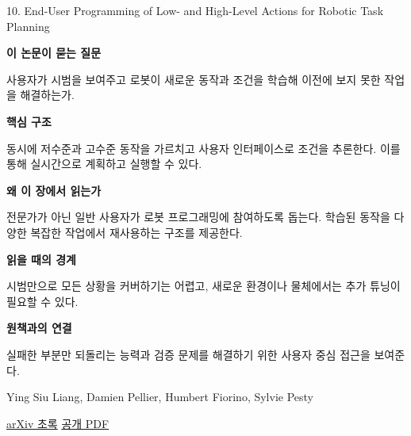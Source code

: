 \documentclass[11pt,openany]{book}
\begin{document}
\begin{termcard}{10. End-User Programming of Low- and High-Level Actions for Robotic Task Planning}

\par

\medskip

{\sffamily\bfseries\color{deepblue} 이 논문이 묻는 질문}\par

사용자가 시범을 보여주고 로봇이 새로운 동작과 조건을 학습해 이전에 보지 못한 작업을 해결하는가.

\smallskip

{\sffamily\bfseries\color{deepblue} 핵심 구조}\par

동시에 저수준과 고수준 동작을 가르치고 사용자 인터페이스로 조건을 추론한다. 이를 통해 실시간으로 계획하고 실행할 수 있다.

\smallskip

{\sffamily\bfseries\color{deepblue} 왜 이 장에서 읽는가}\par

전문가가 아닌 일반 사용자가 로봇 프로그래밍에 참여하도록 돕는다. 학습된 동작을 다양한 복잡한 작업에서 재사용하는 구조를 제공한다.

\smallskip

{\sffamily\bfseries\color{coral} 읽을 때의 경계}\par

시범만으로 모든 상황을 커버하기는 어렵고, 새로운 환경이나 물체에서는 추가 튜닝이 필요할 수 있다.

\smallskip

{\sffamily\bfseries\color{teal} 원책과의 연결}\par

실패한 부분만 되돌리는 능력과 검증 문제를 해결하기 위한 사용자 중심 접근을 보여준다.

\medskip

{\footnotesize\color{muted} Ying Siu Liang, Damien Pellier, Humbert Fiorino, Sylvie Pesty\par

\href{https://arxiv.org/abs/2103.14342}{arXiv 초록} \quad \href{https://arxiv.org/pdf/2103.14342}{공개 PDF}\par}

\end{termcard}
\end{document}
